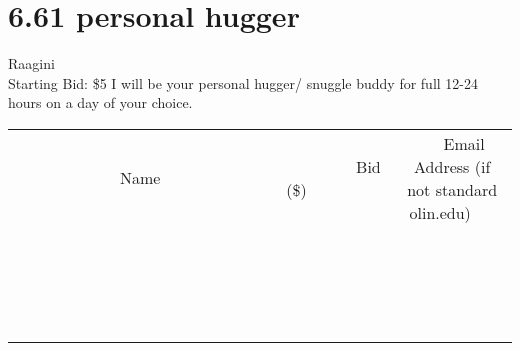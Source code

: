 \documentclass[11pt]{article}
\begin{document}
\section*{6.61 personal hugger}
Raagini
\\
Starting Bid: \$5
\newline
I will be your personal hugger/ snuggle buddy for full 12-24 hours on a day of your choice.
\\[3ex]
\begin{tabular}{c c c}
~~~~~~~~~~~~~Name~~~~~~~~~~~~~ & ~~~~~~~~~Bid (\$)~~~~~~~~~  & ~~~Email Address (if not standard olin.edu)~~~\\
 & & \\
\hline
 & & \\
\hline
 & & \\
\hline
 & & \\
\hline
 & & \\
\hline
 & & \\
\hline
 & & \\
\hline
 & & \\
\hline
 & & \\
\hline
 & & \\
\hline
 & & \\
\hline
 & & \\
\hline
 & & \\
\hline
 & & \\
\hline
 & & \\
\hline
 & & \\
\hline
 & & \\
\hline
 & & \\
\hline
 & & \\
\hline
\end{tabular}
\newpage
\end{document}
